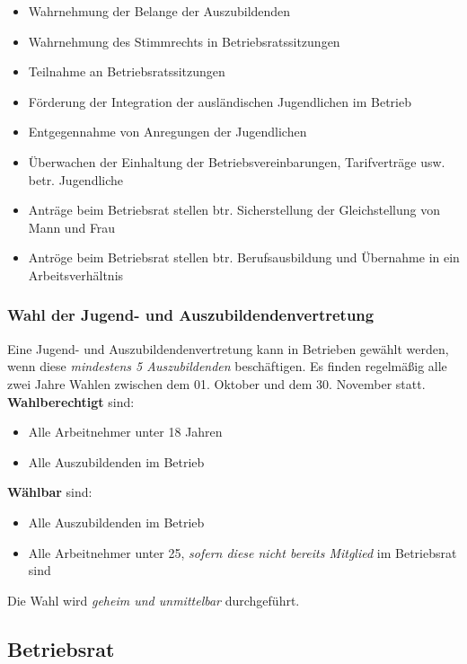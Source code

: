 \documentclass[a4paper, 12pt]{report}
\begin{document}
\begin{itemize}
    \item Wahrnehmung der Belange der Auszubildenden 
    \item Wahrnehmung des Stimmrechts in Betriebsratssitzungen
    \item Teilnahme an Betriebsratssitzungen
    \item Förderung der Integration der ausländischen Jugendlichen im Betrieb
    \item Entgegennahme von Anregungen der Jugendlichen
    \item Überwachen der Einhaltung der Betriebsvereinbarungen, Tarifverträge
        usw. betr. Jugendliche
    \item Anträge beim Betriebsrat stellen btr. Sicherstellung der 
        Gleichstellung von Mann und Frau
    \item Antröge beim Betriebsrat stellen btr. Berufsausbildung und Übernahme 
        in ein Arbeitsverhältnis
\end{itemize}

\subsubsection{Wahl der Jugend- und Auszubildendenvertretung}

Eine Jugend- und Auszubildendenvertretung kann in Betrieben gewählt werden, 
wenn diese \emph{mindestens 5 Auszubildenden} beschäftigen. Es finden 
regelmäßig alle zwei Jahre  Wahlen zwischen dem 01. Oktober und dem 30. November
statt. \\

\textbf{Wahlberechtigt} sind: 

\begin{itemize}
    \item Alle Arbeitnehmer unter 18 Jahren
    \item Alle Auszubildenden im Betrieb
\end{itemize}

\textbf{Wählbar} sind: 
\begin{itemize}
    \item Alle Auszubildenden im Betrieb
    \item Alle Arbeitnehmer unter 25, \emph{sofern diese nicht bereits Mitglied}
        im Betriebsrat sind
\end{itemize}

Die Wahl wird \emph{geheim und unmittelbar} durchgeführt.

\newpage
\subsection{Betriebsrat}
\end{document}
